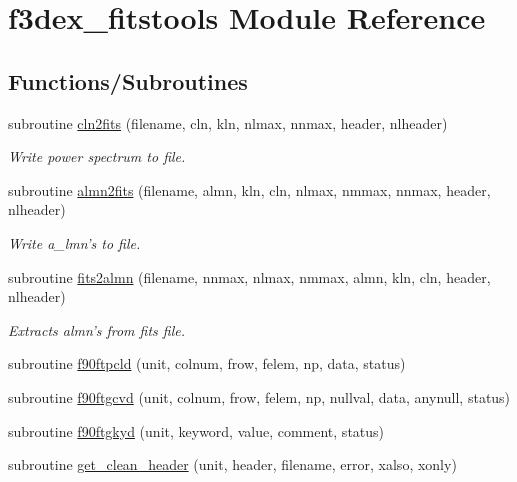 \hypertarget{namespacef3dex__fitstools}{
\section{f3dex\_\-fitstools Module Reference}
\label{namespacef3dex__fitstools}
}
\subsection*{Functions/Subroutines}
\begin{DoxyCompactItemize}
\item 
subroutine \hyperlink{namespacef3dex__fitstools_aab1f14e65c2837494cb15ff4fd54b372}{cln2fits} (filename, cln, kln, nlmax, nnmax, header, nlheader)
\begin{DoxyCompactList}\small\item\em Write power spectrum to file. \end{DoxyCompactList}\item 
subroutine \hyperlink{namespacef3dex__fitstools_a3bb8fd149a1c137d3176d484e28bbef0}{almn2fits} (filename, almn, kln, cln, nlmax, nmmax, nnmax, header, nlheader)
\begin{DoxyCompactList}\small\item\em Write a\_\-lmn's to file. \end{DoxyCompactList}\item 
subroutine \hyperlink{namespacef3dex__fitstools_a106cd0d1eb3bcd38d2c43228f499f57b}{fits2almn} (filename, nnmax, nlmax, nmmax, almn, kln, cln, header, nlheader)
\begin{DoxyCompactList}\small\item\em Extracts almn's from fits file. \end{DoxyCompactList}\item 
subroutine \hyperlink{namespacef3dex__fitstools_a83e1158f828e86e43f1dc68bc0e7c59b}{f90ftpcld} (unit, colnum, frow, felem, np, data, status)
\item 
subroutine \hyperlink{namespacef3dex__fitstools_ada7b447f4ace46eabf663495c3a8c8c2}{f90ftgcvd} (unit, colnum, frow, felem, np, nullval, data, anynull, status)
\item 
subroutine \hyperlink{namespacef3dex__fitstools_ab7baecf48bb7833c32bc7be570f947c1}{f90ftgkyd} (unit, keyword, value, comment, status)
\item 
subroutine \hyperlink{namespacef3dex__fitstools_a0d143b6a055e5c50c19b86e75d94c663}{get\_\-clean\_\-header} (unit, header, filename, error, xalso, xonly)
\item 

\end{DoxyCompactItemize}
